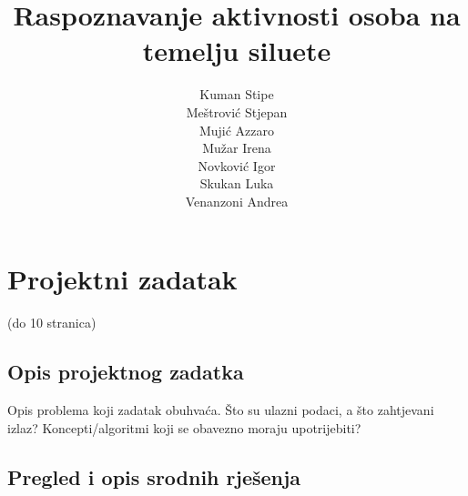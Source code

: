 \documentclass[times, utf8, diplomski]{fer}
\begin{document}
\title{ Raspoznavanje aktivnosti osoba na temelju siluete }


\author{ \begin{tabular}{ l }
	Kuman Stipe \\
	Meštrović Stjepan \\
	Mujić Azzaro \\
	Mužar Irena \\
	Novković Igor \\
	Skukan Luka \\
	Venanzoni Andrea \\
\end{tabular}  }

\maketitle

\zahvala{}

\tableofcontents


\chapter{Projektni zadatak}

(do 10 stranica)

\section{Opis projektnog zadatka}

Opis problema koji zadatak obuhvaća. Što su ulazni podaci, a što zahtjevani izlaz? Koncepti/algoritmi koji se obavezno moraju upotrijebiti?

\section{Pregled i opis srodnih rješenja}
\end{document}
